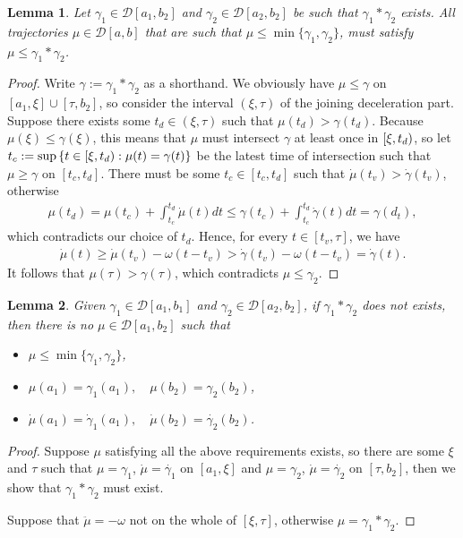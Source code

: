 \documentclass[a4paper]{article}
\theoremstyle{definition}
\theoremstyle{plain}
\newtheorem{lemma}{Lemma\hspace{0.25em}\ignorespaces}
\begin{document}
\begin{lemma}\label{lemma:upperbound}
  Let $\gamma_{1} \in \mathcal{D}[a_{1}, b_{2}]$ and
  $\gamma_{2} \in \mathcal{D}[a_{2}, b_{2}]$ be such that $\gamma_{1} * \gamma_{2}$ exists. All
  trajectories $\mu \in \mathcal{D}[a, b]$ that are such that
  $\mu \leq \min\{\gamma_{1}, \gamma_{2}\}$, must satisfy $\mu \leq \gamma_{1} * \gamma_{2}$.
\end{lemma}
\begin{proof}
  Write $\gamma := \gamma_{1} * \gamma_{2}$ as a shorthand. We obviously have
  $\mu \leq \gamma$ on $[a_{1}, \xi] \cup [\tau, b_{2}]$, so consider the interval $(\xi, \tau)$ of the joining
  deceleration part. Suppose there exists some $t_{d} \in (\xi, \tau)$ such that
  $\mu(t_{d}) > \gamma(t_{d})$. Because $\mu(\xi) \leq \gamma(\xi)$, this means that $\mu$ must
  intersect $\gamma$ at least once in $[\xi,t_{d})$, so let
  $t_{c} := \sup \, \{ t \in [\xi,t_{d}) : \mu(t) = \gamma(t) \}$ be the latest
  time of intersection such that $\mu \geq \gamma$ on $[t_{c}, t_{d}]$. There must be
  some $t_{c} \in [t_{c}, t_{d}]$ such that $\dot{\mu}(t_{v}) > \dot{\gamma}(t_{v})$, otherwise
  \begin{align*}
    \mu(t_{d}) = \mu(t_{c}) + \int_{t_{c}}^{t_{d}} \dot{\mu}(t) dt \leq \gamma(t_{c}) + \int_{t_{c}}^{t_{d}} \dot{\gamma}(t) dt = \gamma(d_{t}) ,
  \end{align*}
  which contradicts our choice of $t_{d}$. Hence, for every
  $t \in [t_{v}, \tau]$, we have
  \begin{align*}
    \dot{\mu}(t) \geq \dot{\mu}(t_{v}) - \omega (t - t_{v}) > \dot{\gamma}(t_{v}) - \omega(t - t_{v}) = \dot{\gamma}(t) .
  \end{align*}
  It follows that $\mu(\tau) > \gamma(\tau)$, which contradicts
  $\mu \leq \gamma_{2}$.
\end{proof}

\begin{lemma}
  Given $\gamma_{1} \in \mathcal{D}[a_{1}, b_{1}]$ and $\gamma_{2} \in \mathcal{D}[a_{2},b_{2}]$, if $\gamma_{1} * \gamma_{2}$ does not exists, then there is no $\mu \in \mathcal{D}[a_{1}, b_{2}]$ such that
  \begin{itemize}[leftmargin=3em]
    \item $\mu \leq \min\{\gamma_{1}, \gamma_{2}\}$,
    \item $\mu(a_{1}) = \gamma_{1}(a_{1}), \quad \mu(b_{2}) = \gamma_{2}(b_{2})$,
    \item $\dot{\mu}(a_{1}) = \dot{\gamma}_{1}(a_{1}), \quad \dot{\mu}(b_{2}) = \dot{\gamma_{2}}(b_{2})$.
  \end{itemize}
\end{lemma}
\begin{proof}
  Suppose $\mu$ satisfying all the above requirements exists, so there are some
  $\xi$ and $\tau$ such that $\mu = \gamma_{1}$, $\dot{\mu} = \dot{\gamma_{1}}$
  on $[a_{1}, \xi]$ and $\mu = \gamma_{2}$, $\dot{\mu} = \dot{\gamma_{2}}$ on
  $[\tau, b_{2}]$, then we show that $\gamma_{1} * \gamma_{2}$ must exist.

  Suppose that $\ddot{\mu} = -\omega$ not on the whole of $[\xi, \tau]$,
  otherwise $\mu = \gamma_{1} * \gamma_{2}$.
\end{proof}
\end{document}
